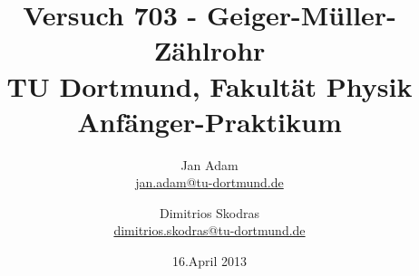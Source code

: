 



\title{Versuch 703 - Geiger-Müller-Zählrohr \\				%
\large TU Dortmund, Fakultät Physik\\ 
\normalsize Anfänger-Praktikum}

\author{Jan Adam\\			%
{\small \href{jan.adam@tu-dortmund.de}{jan.adam@tu-dortmund.de}}	%
\and						%
Dimitrios Skodras\\					%
{\small \href{dimitrios.skodras@tu-dortmund.de}{dimitrios.skodras@tu-dortmund.de}}		%
}
\date{16.April 2013}				%





\maketitle					%
\thispagestyle{empty} 				%



\tableofcontents


\newpage					%


